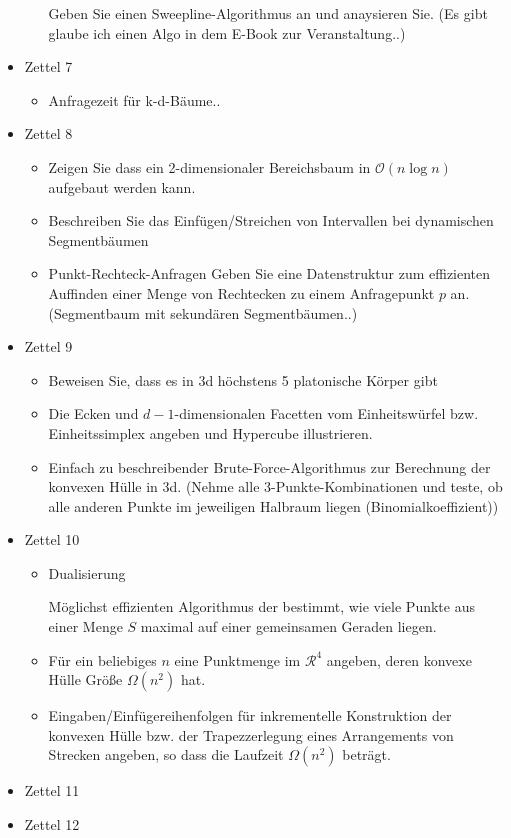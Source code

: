 \documentclass[a4paper]{article}
\begin{document}
\begin{itemize}
\begin{itemize}
		Geben Sie einen Sweepline-Algorithmus an und anaysieren Sie. (Es gibt glaube ich einen Algo
		in dem E-Book zur Veranstaltung..)
	\end{itemize}
	\item Zettel 7
	\begin{itemize}
		\item Anfragezeit für k-d-Bäume..
	\end{itemize}
	\item Zettel 8
	\begin{itemize}
		\item Zeigen Sie dass ein 2-dimensionaler Bereichsbaum in $\mathcal{O}(n \log n)$ aufgebaut
		werden kann.
		\item Beschreiben Sie das Einfügen/Streichen von Intervallen bei dynamischen Segmentbäumen
		\item Punkt-Rechteck-Anfragen
		Geben Sie eine Datenstruktur zum effizienten Auffinden einer Menge von Rechtecken zu einem
		Anfragepunkt $p$ an. (Segmentbaum mit sekundären Segmentbäumen..)
	\end{itemize}
	\item Zettel 9
	\begin{itemize}
		\item Beweisen Sie, dass es in 3d höchstens 5 platonische Körper gibt
		\item Die Ecken und $d-1$-dimensionalen Facetten vom Einheitswürfel bzw. 
		Einheitssimplex angeben und Hypercube illustrieren.
		\item Einfach zu beschreibender Brute-Force-Algorithmus zur Berechnung der konvexen
		Hülle in 3d. (Nehme alle 3-Punkte-Kombinationen und teste, ob alle anderen Punkte im jeweiligen
		Halbraum liegen (Binomialkoeffizient))
	\end{itemize}
	\item Zettel 10
	\begin{itemize}
		\item Dualisierung
		
		Möglichst effizienten Algorithmus der bestimmt, wie viele Punkte aus einer Menge $S$ 
		maximal auf einer gemeinsamen Geraden liegen.
		
		\item Für ein beliebiges $n$ eine Punktmenge im $\mathcal{R}^4$ angeben, deren konvexe
		Hülle Größe $\Omega(n^2)$ hat. 
		
		\item Eingaben/Einfügereihenfolgen für inkrementelle Konstruktion der konvexen Hülle bzw. 
		der Trapezzerlegung eines Arrangements von Strecken angeben, so dass die Laufzeit
		$\Omega(n^2)$ beträgt.
	\end{itemize}
	\item Zettel 11
	\item Zettel 12
\end{itemize}
\end{document}
